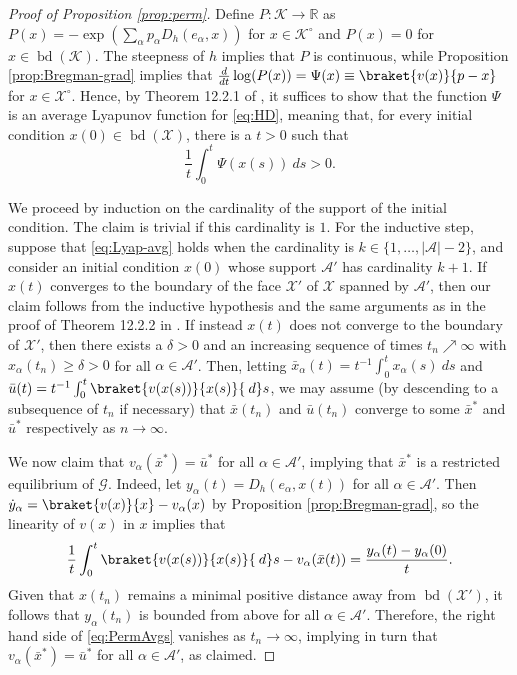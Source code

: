 \documentclass[reqno]{amsart}
\theoremstyle{plain}
\theoremstyle{definition}
\theoremstyle{remark}
\numberwithin{equation}{section}
\numberwithin{theorem}{section}
\begin{document}
\begin{proof}[Proof of Proposition \ref{prop:perm}]
Define $P{\colon}{\mathcal{K}}\to{\mathbb{R}}$ as $P(x) = -\exp\left(\sum_{\alpha} p_{\alpha} {D_{h}}({e}_{\alpha}, x)\right)$ for $x\in{{\mathcal{K}}^{\circ}}$ and $P(x) = 0$ for $x\in\operatorname{bd}({\mathcal{K}})$.
The steepness of $h$ implies that $P$ is continuous, while Proposition \ref{prop:Bregman-grad} implies that $\frac{d}{dt}\log(P(x)) = \Psi(x) \equiv \braket{{v}(x)}{p - x}$ for $x \in {{\mathcal{X}}^{\circ}}$.
Hence, by Theorem 12.2.1 of \cite{HS98}, it suffices to show that the function $\Psi$ is an average Lyapunov function for \eqref{eq:HD}, meaning that, for every initial condition $x(0)\in\operatorname{bd}({\mathcal{X}})$, there is a $t>0$ such that
\begin{equation}
\label{eq:Lyap-avg}
\frac{1}{t}\int_{0}^{t} \Psi(x(s)) {\:d} s
	> 0.
\end{equation}

We proceed by induction on the cardinality of the support of the initial condition.
The claim is trivial if this cardinality is $1$.
For the inductive step, suppose that \eqref{eq:Lyap-avg} holds when the cardinality is $k \in \{1, \ldots , |{\mathcal{A}}|-2\}$, and consider an initial condition $x(0)$ whose support ${\mathcal{A}}'$ has cardinality $k +1$.
If $x(t)$ converges to the boundary of the face ${\mathcal{X}}'$ of ${\mathcal{X}}$ spanned by ${\mathcal{A}}'$, then our claim follows from the inductive hypothesis and the same arguments as in the proof of Theorem 12.2.2 in \cite{HS98}.
If instead $x(t)$ does not converge to the boundary of ${\mathcal{X}}'$, then there exists a $\delta>0$ and an increasing sequence of times $t_{n}\nearrow\infty$ with $x_{\alpha}(t_{n}) \geq \delta > 0$ for all $\alpha\in{\mathcal{A}}'$.
Then, letting $\bar x_{\alpha}(t) = t^{-1} \int_{0}^{t} x_{\alpha}(s) {\:d} s$ and $\bar u(t) = t^{-1} \int_{0}^{t} \braket{{v}(x(s))}{x(s)} {\:d} s$, we may assume (by descending to a subsequence of $t_{n}$ if necessary) that $\bar x(t_{n})$ and $\bar u(t_{n})$ converge to some ${\bar x^{\ast}}$ and $\bar u^{\ast}$ respectively as $n\to\infty$.

We now claim that ${v}_{\alpha}({\bar x^{\ast}}) = \bar u^{\ast}$ for all $\alpha\in{\mathcal{A}}'$, implying that ${\bar x^{\ast}}$ is a restricted equilibrium of ${\mathcal{G}}$.
Indeed, let ${y}_{\alpha}(t) = {D_{h}}({e}_{\alpha},x(t))$ for all $\alpha\in{\mathcal{A}}'$.
Then 
\(
\dot {y}_{\alpha}
	= \braket{{v}(x)}{x} - {v}_{\alpha}(x)
\)
by Proposition \ref{prop:Bregman-grad}, so the linearity of ${v}(x)$ in $x$ implies that
\begin{equation}
\label{eq:PermAvgs}
\frac{1}{t} \int_{0}^{t} \braket{{v}(x(s))}{x(s)} {\:d} s - {v}_{\alpha}(\bar x(t)) 
	= \frac{{y}_{\alpha}(t) - {y}_{\alpha}(0)}{t}.
\end{equation}
Given that $x(t_{n})$ remains a minimal positive distance away from $\operatorname{bd}({\mathcal{X}}')$, it follows that ${y}_{\alpha}(t_n)$ is bounded from above for all $\alpha\in{\mathcal{A}}'$.
Therefore, the right hand side of \eqref{eq:PermAvgs} vanishes as $t_{n}\to\infty$, implying in turn that ${v}_{\alpha}({\bar x^{\ast}}) = \bar u^{\ast}$ for all $\alpha\in{\mathcal{A}}'$, as claimed.


\end{proof}
\end{document}
